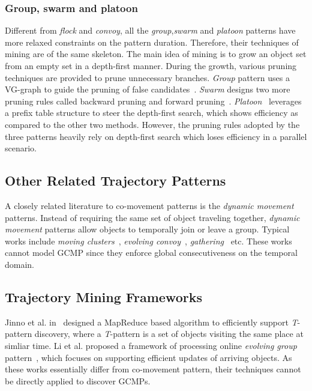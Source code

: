 \subsubsection{Group, swarm and platoon}
Different from \emph{flock} and \emph{convoy}, all the \emph{group},\emph{swarm} and \emph{platoon}
patterns have more relaxed constraints on the pattern duration. Therefore, their techniques of mining are of
the same skeleton. The main idea of mining is to grow an object set from an empty set
in a depth-first manner. During the growth, various pruning techniques are provided to prune 
unnecessary branches. \emph{Group} pattern uses a VG-graph to guide the pruning of false candidates~\cite{wang2006grouppattern}.
\emph{Swarm} designs two more pruning rules called backward pruning and forward pruning~\cite{li2010swarm}. \emph{Platoon}~\cite{li2015platoon}
leverages a prefix table structure to steer the depth-first search, which shows efficiency 
as compared to the other two methods.
However, the pruning rules adopted by the three patterns heavily rely on depth-first search which loses efficiency in a parallel scenario.


\subsection{Other Related Trajectory Patterns}
A closely related literature to co-movement patterns is the \emph{dynamic movement} patterns. Instead of requiring the same set of object traveling together, \emph{dynamic movement} patterns allow objects to temporally join or leave a group. Typical works include \emph{moving clusters}~\cite{kalnis2005movingclusters}, \emph{evolving convoy}~\cite{aung2010discovery}, \emph{gathering}~\cite{zheng2013gathering} etc. These works cannot model GCMP since they enforce global consecutiveness on the 
temporal domain.
 
\subsection{Trajectory Mining Frameworks}
Jinno et al. in~\cite{jinno2012paralleltpattern} designed a MapReduce based algorithm to efficiently support \emph{T}-pattern discovery, where a \emph{T}-pattern is a set of objects visiting the same place at simliar time. Li et al. proposed a framework of processing online \emph{evolving group} pattern~\cite{li2013onlinegroup}, which focuses on supporting efficient updates of arriving objects. 
As these works essentially differ from co-movement pattern, their techniques cannot be directly applied to discover GCMPs.